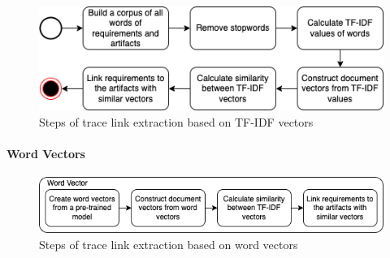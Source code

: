       \begin{figure}[htb]
        \centering
        \includegraphics[width=0.99\linewidth]{figs/tfidfvector2.png}
        \caption{Steps of trace link extraction based on TF-IDF vectors}
        \label{fig:tfidfvec}
      \end{figure}

      \paragraph{Word Vectors}
       \begin{figure}[htb]
        \centering
        \includegraphics[width=0.99\linewidth]{figs/wordvector.png}
        \caption{Steps of trace link extraction based on word vectors}
        \label{fig:wordvec}
      \end{figure}









